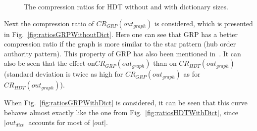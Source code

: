 \begin{figure}[h]
	\centering
	\hfill
	\caption{The compression ratios for HDT without and with dictionary sizes.}
\end{figure}

Next the compression ratio of $CR_{GRP}(out_{graph})$ is considered, which is presented in Fig.~\ref{fig:ratiosGRPWithoutDict}. Here one can see that GRP has a better compression ratio if the graph is more similar to the star pattern (hub order authority pattern). This property of GRP has also been mentioned in~\cite{maneth}. It can also be seen that the effect on$CR_{GRP}(out_{graph})$ than on $CR_{HDT}(out_{graph})$ (standard deviation is twice as high for $CR_{GRP}(out_{graph})$ as for $CR_{HDT}(out_{graph})$). 

When Fig.~\ref{fig:ratiosGRPWithDict} is considered, it can be seen that this curve behaves almost exactly like the one from Fig.~\ref{fig:ratiosHDTWithDict}, since $|out_{dict}|$ accounts for most of $|out|$.

